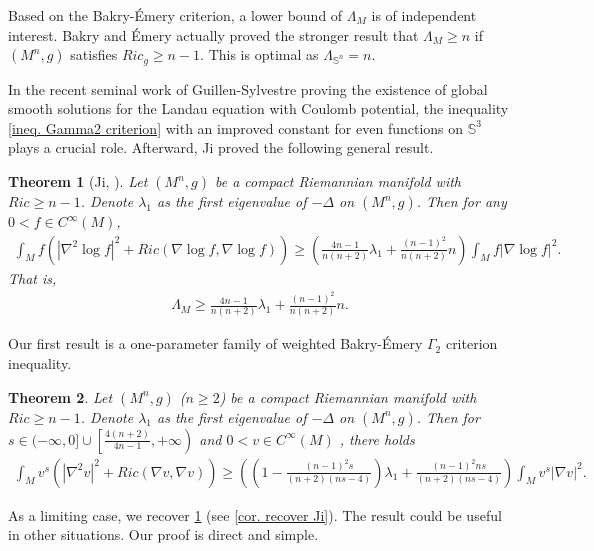 \documentclass[11pt]{amsart}
\newtheorem{theorem}{Theorem}
\numberwithin{equation}{section}
\numberwithin{lemma}{section}
\numberwithin{proposition}{section}
\numberwithin{corollary}{section}
\numberwithin{remark}{section}
\begin{document}
    
    Based on the Bakry-\'Emery criterion, a lower bound of $\Lambda_M$ is of independent interest. Bakry and \'{E}mery \cite{BE06} actually proved the stronger result that $\Lambda_M\geq  n$ if $(M^n,g)$ satisfies $Ric_g\geq n-1$. This is optimal as $\Lambda_{\mathbb{S}^n}=  n$.

     In the recent seminal work of Guillen-Sylvestre \cite{GS25} proving the existence of global smooth solutions for the Landau equation with Coulomb potential,  the inequality \cref{ineq. Gamma2 criterion} with an improved constant for even functions on $\mathbb{S}^3$ plays a crucial role. Afterward, Ji \cite[Theorem 2.3]{Ji24} proved the following general result.
    \begin{theorem}[Ji, \cite{Ji24}]\label{thm. Ji}
        Let $(M^n,g)$ be a compact Riemannian manifold with $Ric\geq n-1$. Denote $\lambda_1$ as the first eigenvalue of $-\Delta $ on $(M^n,g)$. Then for any $0<f\in C^{\infty}(M)$,
        \begin{align*}
            \int_M f(|\nabla^2\log f|^2+Ric(\nabla \log f,\nabla \log f))
        \geq 
        \left(
        \frac{4n-1}{n(n+2)}\lambda_1
            +\frac{(n-1)^2}{n(n+2)}n
            \right)
            \int_M f|\nabla \log f|^2.
        \end{align*}
        That is,
        \begin{align*}
            \Lambda_M\geq \frac{4n-1}{n(n+2)}\lambda_1
            +\frac{(n-1)^2}{n(n+2)}n.
        \end{align*}
    \end{theorem}

    Our first result is a one-parameter family of weighted Bakry-\'{E}mery $\Gamma_2$ criterion inequality.
    
 \begin{theorem}\label{thm. CW}
     Let $(M^n,g)$ ($n\geq 2$) be a compact Riemannian manifold  with $Ric\geq n-1$.
     Denote $\lambda_1$ as the first eigenvalue of $-\Delta $ on $(M^n,g)$.
    Then for $s\in(-\infty,0]\cup\left[\frac{4(n+2)}{4n-1},+\infty\right)$ and $0<v\in C^{\infty}(M)$ , there holds
    \begin{align}\label{ineq. weighted BE Gamma2}
        \int_M v^s(|\nabla^2 v|^2+Ric(\nabla v,\nabla v))
        \geq 
        \left(\left(1-\frac{(n-1)^2s}{(n+2)(ns-4)}\right)\lambda_1
        +\frac{(n-1)^2ns}{(n+2)(ns-4)}
        \right)
        \int_M v^s|\nabla v|^2.
    \end{align}
 \end{theorem}
 As a limiting case, we recover \cref{thm. Ji} (see \cref{cor. recover Ji}). The result could be useful in other situations.  Our proof is direct and simple.
 
\end{document}
